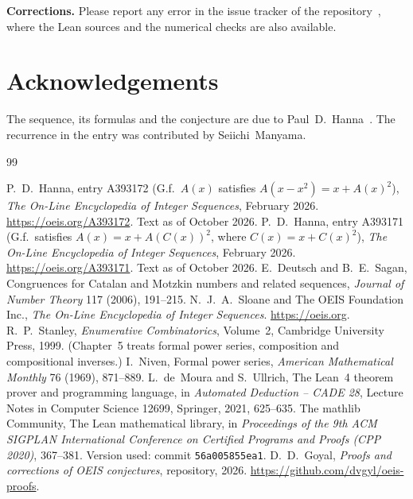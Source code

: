 \documentclass[11pt,a4paper]{article}
\theoremstyle{definition}
\theoremstyle{remark}
\newcommand{\para}[1]{\par\medskip\noindent\textbf{#1}\enspace}
\begin{document}
\para{Corrections.} Please report any error in the issue tracker of the repository~\cite{repo}, where the Lean sources and the numerical checks are also
available.

\section*{Acknowledgements}
The sequence, its formulas and the conjecture are due to Paul~D.~Hanna~\cite{oeis}. The recurrence in the entry was
contributed by Seiichi~Manyama.

\begin{thebibliography}{99}\small
\raggedright
{} P.~D.~Hanna, entry A393172 (G.f.\ $A(x)$ satisfies $A(x-x^2)=x+A(x)^2$), \emph{The On-Line Encyclopedia of Integer Sequences}, February 2026. \url{https://oeis.org/A393172}. Text as of October 2026.
 P.~D.~Hanna, entry A393171 (G.f.\ satisfies $A(x)=x+A(C(x))^2$, where $C(x)=x+C(x)^2$), \emph{The On-Line Encyclopedia of Integer Sequences}, February 2026. \url{https://oeis.org/A393171}. Text as of October 2026.
 E.~Deutsch and B.~E.~Sagan, Congruences for Catalan and Motzkin numbers and related sequences, \emph{Journal of Number Theory} 117 (2006), 191--215.
 N.~J.~A.~Sloane and The OEIS Foundation Inc., \emph{The On-Line Encyclopedia of Integer Sequences}. \url{https://oeis.org}.
 R.~P.~Stanley, \emph{Enumerative Combinatorics}, Volume~2, Cambridge University Press, 1999. (Chapter~5 treats formal power series, composition and compositional inverses.)
 I.~Niven, Formal power series, \emph{American Mathematical Monthly} 76 (1969), 871--889.
 L.~de~Moura and S.~Ullrich, The Lean~4 theorem prover and programming language, in \emph{Automated Deduction -- CADE 28}, Lecture Notes in Computer Science 12699, Springer, 2021, 625--635.
 The mathlib Community, The Lean mathematical library, in \emph{Proceedings of the 9th ACM SIGPLAN International Conference on Certified Programs and Proofs (CPP 2020)}, 367--381. Version used: commit \texttt{56a005855ea1}.
 D.~D.~Goyal, \emph{Proofs and corrections of OEIS conjectures}, repository, 2026. \url{https://github.com/dvgyl/oeis-proofs}.
\end{thebibliography}
\end{document}
